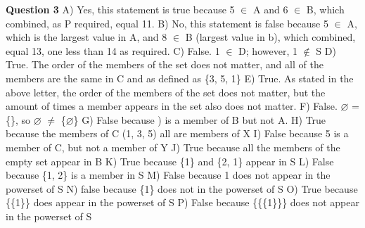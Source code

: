 \documentclass{article}
\begin{document}
\textbf{Question 3}\newline
A)	Yes, this statement is true because 5 $\mathbb{\in}$ A and 6 $\mathbb{\in}$ B, which combined, as P required, equal 11.\newline
B)	No, this statement is false because  5 $\mathbb{\in}$ A, which is the largest value in A, and 8 $\mathbb{\in}$ B (largest value in b), which combined, equal 13, one less than 14 as required.\newline
C)	False. 1 $\mathbb{\in}$ D; however, 1 $\mathbb{\notin}$ S\newline
D)	True. The order of the members of the set does not matter, and all of the members are the same in C and as defined as \{3, 5, 1\}\newline
E)	True. As stated in the above letter, the order of the members of the set does not matter, but the amount of times a member appears in the set also does not matter.\newline
F)	False. $\mathbb{\varnothing}$ = \{\}, so $\mathbb{\varnothing}$ $\neq$ \{$\mathbb{\varnothing}$\}\newline
G)	False because ) is a member of B but not A.\newline
H)	True because the members of C (1, 3, 5) all are members of X\newline
I)	False because 5 is a member of C, but not a member of Y\newline
J)	True because all the members of the empty set appear in B\newline
K)	True because \{1\} and \{2, 1\} appear in S\newline
L)	False because \{1, 2\} is a member in S\newline
M)	False because 1 does not appear in the powerset of S\newline
N)	false because \{1\} does not in the powerset of S\newline
O)	True because \{\{1\}\} does appear in the powerset of S\newline
P)	False because \{\{\{1\}\}\} does not appear in the powerset of S\newline\newline
\end{document}
